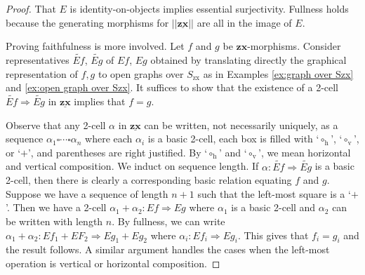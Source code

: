 \documentclass[./1--Catfying_zxCalc--Master.tex]{subfiles} %
\begin{document}
\begin{proof}
	That $E$ is identity-on-objects
	implies essential surjectivity.  
	Fullness holds because 
	the generating morphisms for 
	$|| \underline{\mathbf{zx}} ||$  
	are all in the image of $E$. 
	
	Proving faithfulness is more involved. 
	Let $f$ and $g$ be $\mathbf{zx}$-morphisms. 
	Consider representatives
	$\widetilde{Ef}$, $\widetilde{Eg}$
	of $Ef$, $Eg$ obtained by 
	translating directly
	the graphical representation of $f,g$ 
	to open graphs over $S_{\text{zx}}$ 
	as in Examples \ref{ex:graph over Szx}  
	and \ref{ex:open graph over Szx}. 
	It suffices to show that the 
	existence of a 2-cell 
		$\widetilde{Ef} \Rightarrow \widetilde{Eg}$ 
	in $\underline{\mathbf{zx}}$ 
	implies that $f=g$.  
	
	Observe that any 
	2-cell $\alpha$ in 
	$\underline{\mathbf{zx}}$ 
	can be written, 
	not necessarily uniquely, 
	as a sequence 
		$\alpha_1 \square \dotsm \square \alpha_n$ 
	where each $\alpha_i$ is a basic 2-cell, 
	each box is filled with 
	`$\circ_\text{h}$', `$\circ_\text{v}$', or `$+$', 
	and parentheses are right justified.  
	By `$\circ_\text{h}$' and `$\circ_\text{v}$', 
	we mean horizontal and vertical composition. 
	We induct on sequence length.  
	If $\alpha \colon \widetilde{Ef} \Rightarrow \widetilde{Eg}$ 
	is a basic 2-cell, 
	then there is clearly 
	a corresponding basic relation 
	equating $f$ and $g$.  
	Suppose we have a sequence 
	of length $n+1$ such that 
	the left-most square is a `$+$'. 
	Then we have a 2-cell 
	$\alpha_1 + \alpha_2 \colon Ef \Rightarrow Eg$ 
	where $\alpha_1$ is a basic 2-cell 
	and $\alpha_2$ can be 
	written with length $n$.   
	By fullness, we can write 
	$\alpha_1 + \alpha_2 \colon Ef_1 + EF_2 \Rightarrow Eg_1 + Eg_2$ 
	where $\alpha_i \colon Ef_i \Rightarrow Eg_i$.   
	This gives that $f_i = g_i$  
	and the result follows.  
	A similar argument handles 
	the cases when the 
	left-most operation is 
	vertical or horizontal composition.
\end{proof}
 
% 
\end{document}
